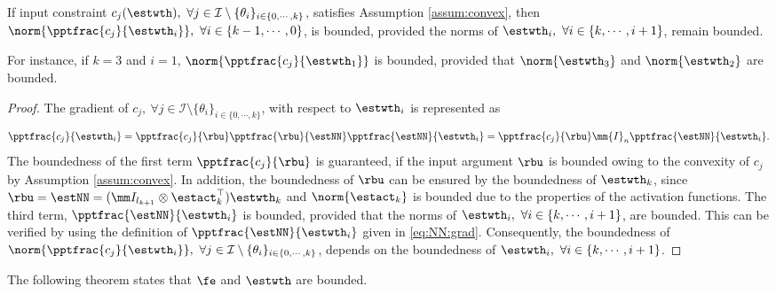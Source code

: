 \documentclass[letterpaper, journal]{IEEEtran}
\begin{document}
\begin{lem} 
    If input constraint $c_j(\estwth),\ \forall j\in\mathcal I \setminus \{\theta_i\}_{i\in\{0,\cdots,k\}}$, satisfies Assumption \ref{assum:convex}, then $\norm{\pptfrac{c_j}{\estwth_i}},\ \forall i\in\{k-1,\cdots, 0\}$, is bounded, provided the norms of $\estwth_i,\ \forall i\in\{k,\cdots, i+1\}$, remain bounded.
    \label{lem:cstr:grad:bound}
\end{lem}

For instance, if $k=3$ and $i=1$, $\norm{\pptfrac{c_j}{\estwth_1}}$ is bounded, provided that $\norm{\estwth_3}$ and $\norm{\estwth_2}$ are bounded.

\begin{proof}

The gradient of $c_j,\ \forall j\in\mathcal I \setminus \{\theta_i\}_{i\in\{0,\cdots,k\}}$, with respect to $\estwth_i$ is represented as
\begin{equation}
    \pptfrac{c_j}{\estwth_i} 
    = 
    \pptfrac{c_j}{\rbu} 
    \pptfrac{\rbu}{\estNN} 
    \pptfrac{\estNN}{\estwth_i}
    = 
    \pptfrac{c_j}{\rbu} 
    \mm{I}_n
    \pptfrac{\estNN}{\estwth_i}
    .
\end{equation}
The boundedness of the first term $\pptfrac{c_j}{\rbu}$ is guaranteed, if the input argument $\rbu$ is bounded owing to the convexity of $c_j$ by Assumption \ref{assum:convex}.
In addition, the boundedness of $\rbu$ can be ensured by the boundedness of $\estwth_k$, since $\rbu=\estNN=(\mm I_{l_{k+1}}\otimes \estact_k^\top)\estwth_k$ and $\norm{\estact_k}$ is bounded due to the properties of the activation functions.
The third term, $\pptfrac{\estNN}{\estwth_i}$ is bounded, provided that the norms of $\estwth_i,\ \forall i \in\{k,\cdots,i+1\}$, are bounded. 
This can be verified by using the definition of $\pptfrac{\estNN}{\estwth_i}$ given in \eqref{eq:NN:grad}.
Consequently, the boundedness of $\norm{\pptfrac{c_j}{\estwth_i}},\ \forall j\in\mathcal I \setminus \{\theta_i\}_{i\in\{0,\cdots,k\}}$, depends on the boundedness of $\estwth_i,\ \forall i\in \{k,\cdots,i+1\}$.

\end{proof}

The following theorem states that $\fe$ and $\estwth$ are bounded.
\end{document}
